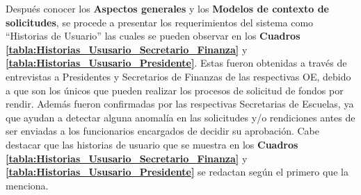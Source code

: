Después conocer los \textbf{Aspectos generales} y los \textbf{Modelos de contexto de solicitudes}, se procede a presentar los requerimientos del sistema como ``Historias de Usuario'' las cuales se pueden observar en los \textbf{Cuadros \ref{tabla:Historias_Ususario_Secretario_Finanza}} y \textbf{\ref{tabla:Historias_Ususario_Presidente}}. Estas fueron obtenidas a través de entrevistas a Presidentes y Secretarios de Finanzas de las respectivas OE, debido a que son los únicos que pueden realizar los procesos de solicitud de fondos por rendir. Además fueron confirmadas por las respectivas Secretarias de Escuelas, ya que ayudan a detectar alguna anomalía en las solicitudes y/o rendiciones antes de ser enviadas a los funcionarios encargados de decidir su aprobación. Cabe destacar que las historias de usuario que se muestra en los \textbf{Cuadros \ref{tabla:Historias_Ususario_Secretario_Finanza}} y \textbf{\ref{tabla:Historias_Ususario_Presidente}} se redactan según el primero que la menciona.

